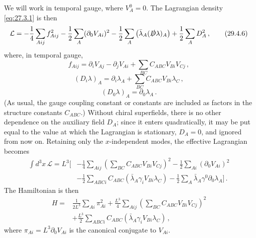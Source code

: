 We will work in temporal gauge, where \(V_A^0=0\). The Lagrangian density
\eqref{eq:27.3.1} is then
\begin{equation}
  \mathcal{L}
  =
  -\frac14\sum_{Aij}f_{Aij}^2
  -\frac12\sum_A(\partial_0V_{Ai})^2
  -\frac12\sum_A\left(\bar\lambda_A(\sl{D}\lambda)_A\right)
  +\frac12\sum_A D_A^2\,,
  \tag{29.4.6}\label{eq:29.4.6}
\end{equation}
where, in temporal gauge,
\begin{equation}
  f_{Aij}
  =
  \partial_iV_{Aj}-\partial_jV_{Ai}
  +\sum_{BC}C_{ABC}V_{Bi}V_{Cj}\,,
  \tag{29.4.7}\label{eq:29.4.7}
\end{equation}
\begin{equation}
  (D_i\lambda)_A
  =
  \partial_i\lambda_A+\sum_{BC}C_{ABC}V_{Bi}\lambda_C\,,
  \tag{29.4.8}\label{eq:29.4.8}
\end{equation}
\begin{equation}
  (D_0\lambda)_A=\partial_0\lambda_A\,.
  \tag{29.4.9}\label{eq:29.4.9}
\end{equation}
(As usual, the gauge coupling constant or constants are included as factors
in the structure constants \(C_{ABC}\).) Without chiral superfields, there
is no other dependence on the auxiliary field \(D_A\); since it enters
quadratically, it may be put equal to the value at which the Lagrangian is
stationary, \(D_A=0\), and ignored from now on. Retaining only the
\(x\)-independent modes, the effective Lagrangian becomes
\begin{equation}
  \begin{aligned}
  \int d^3x\,\mathcal{L}
  =L^3\Bigg[
    &-\frac14\sum_{Aij}
      \left(\sum_{BC}C_{ABC}V_{Bi}V_{Cj}\right)^2
     -\frac12\sum_{Ai}(\partial_0V_{Ai})^2
  \\
    &-\frac12\sum_{ABCi}
      C_{ABC}\left(\bar\lambda_A\gamma_iV_{Bi}\lambda_C\right)
     -\frac12\sum_A\bar\lambda_A\gamma^0\partial_0\lambda_A
  \Bigg]\,.
  \end{aligned}
  \tag{29.4.10}\label{eq:29.4.10}
\end{equation}
The Hamiltonian is then
\begin{equation}
  \begin{aligned}
  H={}&
  \frac{1}{2L^3}\sum_{Ai}\pi_{Ai}^2
  +\frac{L^3}{4}\sum_{Aij}
    \left(\sum_{BC}C_{ABC}V_{Bi}V_{Cj}\right)^2
  \\
  &+\frac{L^3}{2}\sum_{ABCi}
    C_{ABC}\left(\bar\lambda_A\gamma_iV_{Bi}\lambda_C\right)\,,
  \end{aligned}
  \tag{29.4.11}\label{eq:29.4.11}
\end{equation}
where \(\pi_{Ai}=L^3\partial_0V_{Ai}\) is the canonical conjugate to
\(V_{Ai}\).

